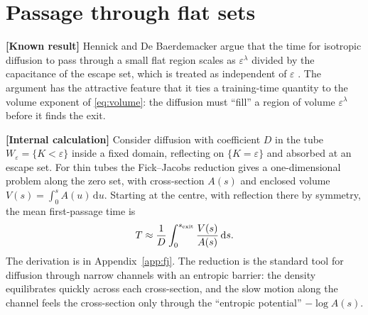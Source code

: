 \documentclass[11pt,a4paper]{article}
\newcommand{\eps}{\varepsilon}
\newcommand{\dd}{\mathrm d}
\newcommand{\evl}[2]{{\small\bfseries\color{#1}[#2]}}
\newcommand{\LKnown}{\evl{cknown}{Known result}}
\newcommand{\LCalc}{\evl{ccalc}{Internal calculation}}
\begin{document}
\section{Passage through flat sets}
\label{sec:flat}

\LKnown{} Hennick and De Baerdemacker argue that the time for isotropic
diffusion to pass through a small flat region scales as $\eps^\lambda$
divided by the capacitance of the escape set, which is treated as
independent of $\eps$ \cite{hennick2026}. The argument has the attractive
feature that it ties a training-time quantity to the volume exponent of
\eqref{eq:volume}: the diffusion must ``fill'' a region of volume
$\eps^\lambda$ before it finds the exit.

\LCalc{} Consider diffusion with coefficient $D$ in the tube
$W_\eps=\{K<\eps\}$ inside a fixed domain, reflecting on $\{K=\eps\}$ and
absorbed at an escape set. For thin tubes the Fick--Jacobs reduction
\cite{zwanzig1992,reguera2001} gives a one-dimensional problem along the
zero set, with cross-section $A(s)$ and enclosed volume
$V(s)=\int_0^sA(u)\,\dd u$. Starting at the centre, with reflection there by
symmetry, the mean first-passage time is
\begin{equation}
T\approx\frac1D\int_0^{s_{\rm exit}}\frac{V(s)}{A(s)}\,\dd s .
\label{eq:fj}
\end{equation}
The derivation is in Appendix~\ref{app:fj}. The reduction is the
standard tool for diffusion through narrow channels with an entropic
barrier: the density equilibrates quickly across each cross-section, and
the slow motion along the channel feels the cross-section only through the
``entropic potential'' $-\log A(s)$.
\end{document}
